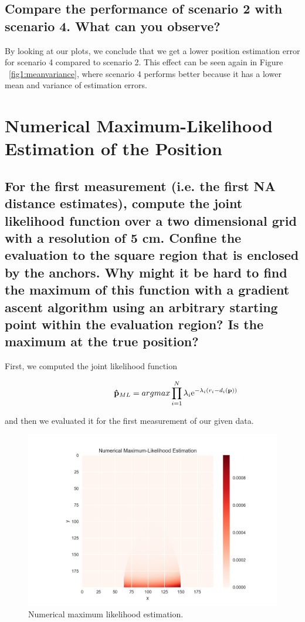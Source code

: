 \subsection{Compare the performance of scenario 2 with scenario 4. What can you observe?}
By looking at our plots, we conclude that we get a lower position estimation error for scenario 4 compared to scenario 2. This effect can be seen again in Figure ~\ref{fig1:meanvariance}, where scenario 4 performs better because it has a lower mean and variance of estimation errors.
\newpage

\section{Numerical Maximum-Likelihood Estimation of the Position}

\subsection{For the first measurement (i.e. the first NA distance estimates), compute the joint likelihood function over a two dimensional grid with a resolution of 5 cm. Confine the evaluation to the square region that is enclosed by the anchors. Why might it be hard to find the maximum of this function with a gradient ascent algorithm using an arbitrary starting point within the evaluation region? Is the maximum at the true position?}

First, we computed the joint likelihood function

\begin{align*}
\hspace*{2cm}
\mathbf{\hat{p}}_{ML} = argmax \prod\limits_{i=1}^N \lambda_i \exp{-\lambda_i(r_i-d_i(\mathbf{p}))}
\end{align*}

and then we evaluated it for the first measurement of our given data.

\begin{figure}[H]
	\centering
\includegraphics[width=18cm]{numerical_maximum.png}
	\caption{Numerical maximum likelihood estimation.}
	\label{fig1:nummax}
\end{figure}

